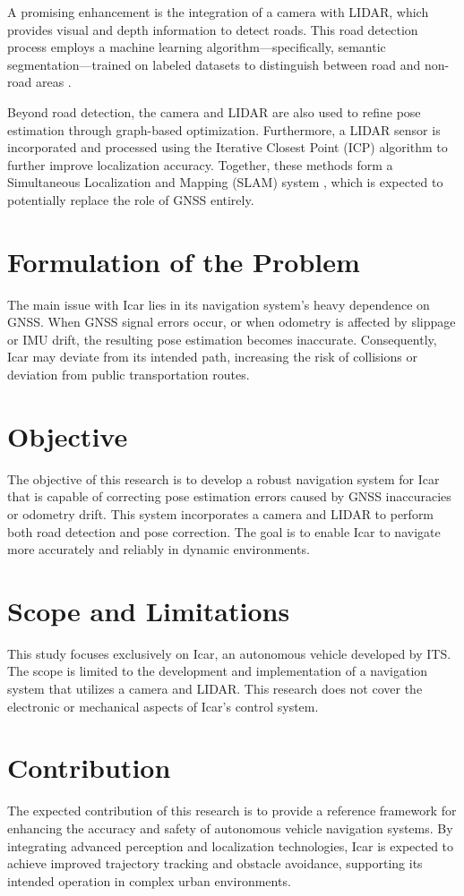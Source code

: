   \par
  A promising enhancement is the integration of a camera with LIDAR, which provides visual and depth information to detect roads. This road detection process employs a machine learning algorithm—specifically, semantic segmentation—trained on labeled datasets to distinguish between road and non-road areas \cite{ref_mas_pandu}.
  
  \par 
  Beyond road detection, the camera and LIDAR are also used to refine pose estimation through graph-based optimization. Furthermore, a LIDAR sensor is incorporated and processed using the Iterative Closest Point (ICP) algorithm to further improve localization accuracy. Together, these methods form a Simultaneous Localization and Mapping (SLAM) system \cite{thrun2005probabilistic}, which is expected to potentially replace the role of GNSS entirely.
  
  \section{Formulation of the Problem}
  The main issue with Icar lies in its navigation system's heavy dependence on GNSS. When GNSS signal errors occur, or when odometry is affected by slippage or IMU drift, the resulting pose estimation becomes inaccurate. Consequently, Icar may deviate from its intended path, increasing the risk of collisions or deviation from public transportation routes.
  
  \section{Objective}
  The objective of this research is to develop a robust navigation system for Icar that is capable of correcting pose estimation errors caused by GNSS inaccuracies or odometry drift. This system incorporates a camera and LIDAR to perform both road detection and pose correction. The goal is to enable Icar to navigate more accurately and reliably in dynamic environments.
  
  \section{Scope and Limitations}
  This study focuses exclusively on Icar, an autonomous vehicle developed by ITS. The scope is limited to the development and implementation of a navigation system that utilizes a camera and LIDAR. This research does not cover the electronic or mechanical aspects of Icar’s control system.
  
  \section{Contribution}
  The expected contribution of this research is to provide a reference framework for enhancing the accuracy and safety of autonomous vehicle navigation systems. By integrating advanced perception and localization technologies, Icar is expected to achieve improved trajectory tracking and obstacle avoidance, supporting its intended operation in complex urban environments.
  